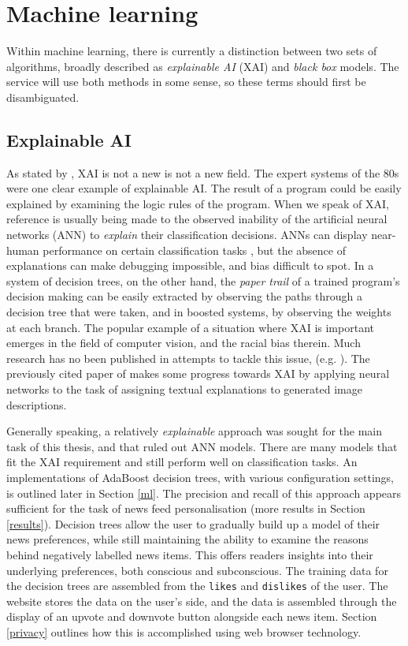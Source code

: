 \section{Machine learning\label{ml-bg}}

Within machine learning, there is currently a distinction between two sets of
algorithms, broadly described as {\it explainable AI} (XAI) and {\it black
box} models. The \nr{} service will use both methods in some sense, so these
terms should first be disambiguated.

\subsection{Explainable AI} As stated by , XAI is not a new
is not a new field. The expert systems of the 80s were one
clear example of explainable AI. The result of a program could be easily
explained by examining the logic rules of the program.
When we speak of XAI, reference is usually being made to the observed
inability of the artificial neural networks (ANN)
to {\it explain} their classification decisions. ANNs can display near-human
performance on certain classification tasks \cite{krizhevsky2012}, but the
absence of explanations can make debugging impossible, and bias difficult to
spot. In a system of decision trees, on the other hand, the {\it paper trail}
of a trained program's decision making can be easily extracted by observing
the paths through a decision tree that were taken, and in boosted systems, by
observing the weights at each branch. The popular example of a situation
where XAI is important emerges in the field of computer vision, and the
racial bias therein. Much research has no been published in attempts
to tackle this issue, (e.g. ). The previously cited paper
of \cite{goebel2018} makes some progress towards XAI by applying
neural networks to the task of assigning textual explanations
to generated image descriptions.

Generally speaking, a relatively {\it explainable} approach
was sought for the main task of this thesis, and that ruled
out ANN models. There are many models that fit the XAI
requirement and still perform well on classification tasks.
An implementations of AdaBoost decision trees, with various
configuration settings, is outlined later in Section \ref{ml}.
The precision and recall of this approach appears sufficient
for the task of news feed personalisation (more results in
Section \ref{results}).  Decision trees allow the user to
gradually build up a model of their news preferences, while
still maintaining the ability to examine the reasons behind
negatively labelled news items.  This offers readers insights
into their underlying preferences, both conscious and
subconscious.  The training data for the decision trees are
assembled from the {\tt likes} and {\tt dislikes} of the user.
The \nr{} website stores the data on the user's side, and the
data is assembled through the display of an upvote
and downvote button alongside each news item.
Section \ref{privacy} outlines how this is accomplished using
web browser technology.